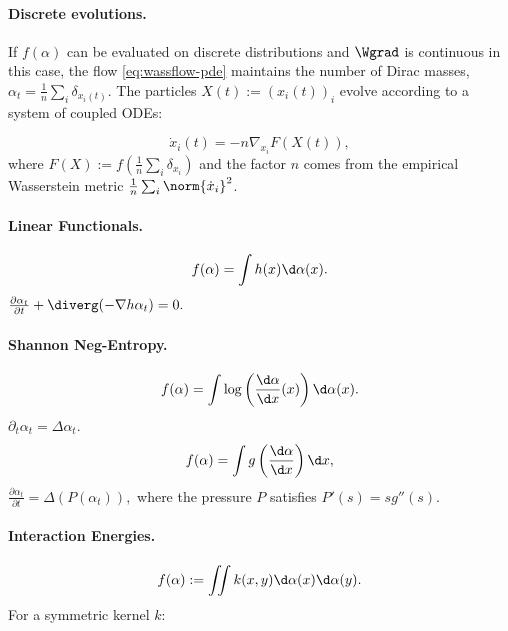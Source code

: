 \paragraph{Discrete evolutions.}
If $f(\alpha)$ can be evaluated on discrete distributions and $\Wgrad$ is continuous in this case, the flow \eqref{eq:wassflow-pde} maintains the number of Dirac masses, $\alpha_t = \frac{1}{n} \sum_i \delta_{x_i(t)}$. The particles $X(t):= (x_i(t))_i$ evolve according to a system of coupled ODEs:

\begin{equation}
\dot{x}_i(t) = -n\nabla_{x_i} F(X(t)), \label{eq:wassflows-particles}
\end{equation}
where $F(X):= f\left(\frac{1}{n} \sum_i \delta_{x_i}\right)$ and the factor $n$ comes from the empirical Wasserstein metric $\frac1n\sum_i \norm{\dot x_i}^2$.

\paragraph{Linear Functionals.}
\begin{equation}\label{eq:linear-func}
f(\alpha) = \int h(x) \d \alpha(x).
\end{equation}
\(\frac{\partial \alpha_t}{\partial t} + \diverg(-\nabla h \alpha_t) = 0.\)
\paragraph{Shannon Neg-Entropy.}
\begin{equation}
f(\alpha) = \int \log\left(\frac{\d \alpha}{\d x}(x)\right) \d \alpha(x). \label{eq:entropy-func}
\end{equation}
\(\partial_t \alpha_t = \Delta \alpha_t.\)
\begin{equation}\label{eq:gen-entropies}
f(\alpha) = \int g\left(\frac{\d \alpha}{\d x}\right) \d x,
\end{equation}
\(\frac{\partial \alpha_t}{\partial t} = \Delta(P(\alpha_t)),\)
where the pressure $P$ satisfies $P'(s)=s g''(s)$.

\paragraph{Interaction Energies.}
\begin{equation}
f(\alpha):= \iint k(x, y) \d \alpha(x) \d \alpha(y). \label{eq:quadratic-func}
\end{equation}
For a symmetric kernel $k$:

